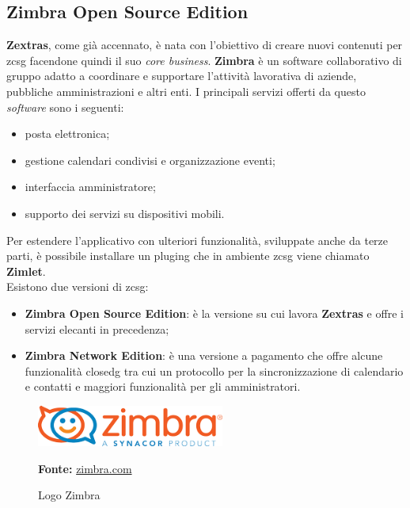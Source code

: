     \subsection{Zimbra Open Source Edition}
        \textbf{Zextras}, come già accennato, è nata con l'obiettivo di creare nuovi contenuti per \gls{zcsg} facendone quindi il suo \textit{core business}.
        \textbf{Zimbra} è un software collaborativo di gruppo adatto a coordinare e supportare l'attività lavorativa di aziende, pubbliche amministrazioni e altri enti. I principali servizi offerti da questo \textit{software} sono i seguenti:
        \begin{itemize}
            \item posta elettronica;
            \item gestione calendari condivisi e organizzazione eventi;
            \item interfaccia amministratore;
            \item supporto dei servizi su dispositivi mobili.
        \end{itemize}
        Per estendere l'applicativo con ulteriori funzionalità, sviluppate anche da terze parti, è possibile installare un \gls{pluging} che in ambiente \gls{zcsg} viene chiamato \textbf{Zimlet}. \\
        Esistono due versioni di \gls{zcsg}:
        \begin{itemize}
            \setlength\itemsep{0em}
            \item \textbf{Zimbra Open Source Edition}: è la versione su cui lavora \textbf{Zextras} e offre i servizi elecanti in precedenza;
            \item \textbf{Zimbra Network Edition}: è una versione a pagamento che offre alcune funzionalità \gls{closedg} tra cui un protocollo per la sincronizzazione di calendario e contatti e maggiori funzionalità per gli amministratori.
        \end{itemize}
        
        \begin{figure}[h]
            \centering
            \includegraphics[width=0.55\textwidth]{immagini/zimbra_logo.png}
            \caption{Logo Zimbra}
            \textbf{Fonte:} \href{https://www.zimbra.com/}{zimbra.com}
            \label{fig: Logo Zimbra}
        \end{figure}
        
